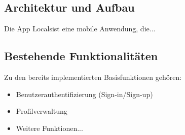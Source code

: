 \subsection{Architektur und Aufbau}
Die App \glqq Locals\grqq ist eine mobile Anwendung, die...

\subsection{Bestehende Funktionalitäten}
Zu den bereits implementierten Basisfunktionen gehören:
\begin{itemize}
    \item Benutzerauthentifizierung (Sign-in/Sign-up)
    \item Profilverwaltung
    \item Weitere Funktionen...
\end{itemize} 